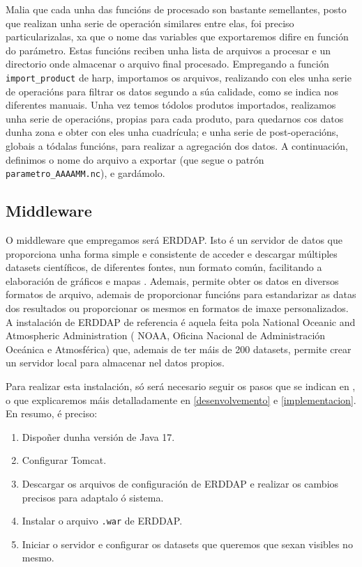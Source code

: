 Malia que cada unha das funcións de procesado son bastante semellantes, posto que realizan unha serie de operación similares entre elas, foi preciso particularizalas, xa que o nome das variables
que exportaremos difire en función do parámetro. Estas funcións reciben unha lista de arquivos a procesar e un directorio onde almacenar o arquivo final procesado. Empregando a función \texttt{
    import\_product} de harp, importamos os arquivos, realizando con eles unha serie de operacións para filtrar os datos segundo a súa calidade, como se indica nos diferentes manuais. Unha vez temos
tódolos produtos importados, realizamos unha serie de operacións, propias para cada produto, para quedarnos cos datos dunha zona e obter con eles unha cuadrícula; e unha serie de post-operacións,
globais a tódalas funcións, para realizar a agregación dos datos. A continuación, definimos o nome do arquivo a exportar (que segue o patrón \texttt{parametro\_AAAAMM.nc}), e gardámolo.

\subsection{Middleware}\label{middleware}
O middleware que empregamos será ERDDAP. Isto é un servidor de datos que proporciona unha forma simple e consistente de acceder e descargar múltiples datasets científicos, de diferentes fontes, nun
formato común, facilitando a elaboración de gráficos e mapas \cite{erddaphome}. Ademais, permite obter os datos en diversos formatos de arquivo, ademais de proporcionar funcións para estandarizar
as datas dos resultados ou proporcionar os mesmos en formatos de imaxe personalizados. A instalación de ERDDAP de referencia é aquela feita pola National Oceanic and Atmospheric Administration (
NOAA, Oficina Nacional de Administración Oceánica e Atmosférica) que, ademais de ter máis de 200 datasets, permite crear un servidor local para almacenar nel datos propios.

Para realizar esta instalación, só será necesario seguir os pasos que se indican en \cite{erddapsetup}, o que explicaremos máis detalladamente en \ref{desenvolvemento} e \ref{implementacion}. En
resumo, é preciso:
\begin{enumerate}
    \item Dispoñer dunha versión de Java 17.
    \item Configurar Tomcat.
    \item Descargar os arquivos de configuración de ERDDAP e realizar os cambios precisos para adaptalo ó sistema.
    \item Instalar o arquivo \texttt{.war} de ERDDAP.
    \item Iniciar o servidor e configurar os datasets que queremos que sexan visibles no mesmo.
\end{enumerate}

